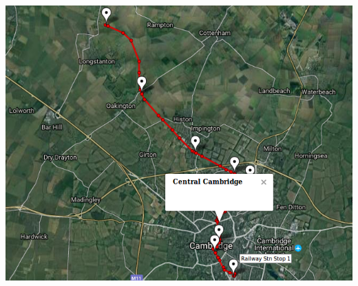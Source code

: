 \documentclass[12pt,a4paper,oneside,openright]{report}
\begin{document}
\includegraphics[width=\textwidth]{figs/cambridge_route.png} \\
\end{document}
